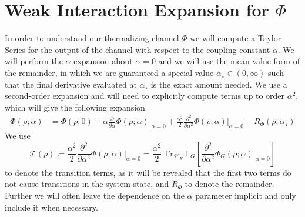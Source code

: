 \documentclass{article}
\DeclareMathOperator{\Tr}{Tr}
\newcommand{\hilb}{\mathcal{H}}
\begin{document}
\section{Weak Interaction Expansion for $\Phi$} \label{sec:taylor_series_phi}
In order to understand our thermalizing channel $\Phi$ we will compute a Taylor Series for the output of the channel with respect to the coupling constant $\alpha$. We will perform the $\alpha$ expansion about $\alpha = 0$ and we will use the mean value form of the remainder, in which we are guaranteed a special value $\alpha_{\star} \in (0, \infty)$ such that the final derivative evaluated at $\alpha_{\star}$ is the exact amount needed. We use a second-order expansion and will need to explicitly compute terms up to order $\alpha^2$, which will give the following expansion
\begin{align}
    \Phi(\rho; \alpha) &= \Phi(\rho; 0) + \alpha \frac{\partial}{\partial \alpha} \Phi(\rho; \alpha) \big|_{\alpha = 0} + \frac{\alpha^2}{2} \frac{\partial^2}{\partial \alpha^2} \Phi(\rho; \alpha) \big|_{\alpha = 0} + R_{\Phi}(\rho; \alpha_{\star}) \label{eq:phi_taylor_series}
\end{align}
We use
\begin{equation}
    \mathcal{T}(\rho) \coloneqq \frac{\alpha^2}{2} \frac{\partial^2}{\partial \alpha^2} \Phi(\rho; \alpha) \bigg|_{\alpha = 0} = \frac{\alpha^2}{2}  \Tr_{\hilb_E} \mathbb{E}_{G} \left[\frac{\partial^2}{\partial \alpha^2} \Phi_G(\rho; \alpha) \big|_{\alpha = 0}\right] \label{eq:transition_def}
\end{equation} to denote the transition terms, as it will be revealed that the first two terms do not cause transitions in the system state, and $R_{\Phi}$ to denote the remainder. 
Further we will often leave the dependence on the  $\alpha$ parameter implicit and only include it when necessary.
\end{document}

